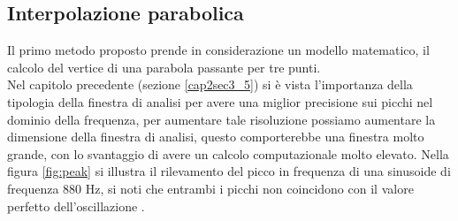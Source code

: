 \documentclass[12pt]{report}
\begin{document}
		\subsection{Interpolazione parabolica}
		\label{cap3sec2_1}
		Il primo metodo proposto prende in considerazione un modello matematico, il calcolo del vertice di una parabola passante per tre punti.\\
Nel capitolo precedente (sezione \ref{cap2sec3_5}) si è vista l'importanza della tipologia della finestra di analisi per avere una miglior precisione sui picchi nel dominio della frequenza, per aumentare tale risoluzione possiamo aumentare la dimensione della finestra di analisi, questo comporterebbe una finestra molto grande, con lo svantaggio di avere un calcolo computazionale molto elevato.
Nella figura \ref{fig:peak} si illustra il rilevamento del picco in frequenza di una sinusoide di frequenza 880 Hz, si noti che entrambi i picchi non coincidono con il valore perfetto dell'oscillazione .\\
\end{document}
